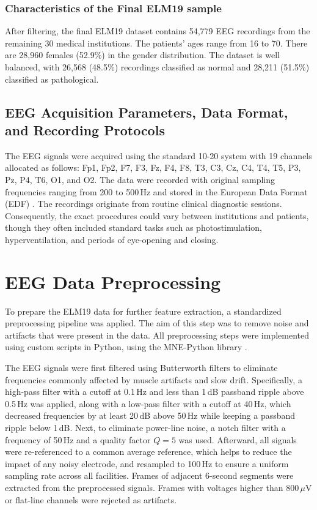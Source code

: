 \documentclass{bachelor2025eng}
\begin{document}
        \subsubsection{Characteristics of the Final ELM19 sample}
        After filtering, the final ELM19 dataset contains 54,779  EEG recordings from the remaining 30 medical institutions. The patients' ages range from 16 to 70. There are 28,960 females (52.9\%) in the gender distribution. The dataset is well balanced, with 26,568 (48.5\%) recordings classified as normal and 28,211 (51.5\%) classified as pathological.

        \subsection{EEG Acquisition Parameters, Data Format, and Recording Protocols}
        The EEG signals were acquired using the standard 10-20 system with 19 channels allocated as follows: Fp1, Fp2, F7, F3, Fz, F4, F8, T3, C3, Cz, C4, T4, T5, P3, Pz, P4, T6, O1, and O2. The data were recorded with original sampling frequencies ranging from 200 to 500\,Hz and stored in the European Data Format (EDF) \cite{Kemp1992}. The recordings originate from routine clinical diagnostic sessions. Consequently, the exact procedures could vary between institutions and patients, though they often included standard tasks such as photostimulation, hyperventilation, and periods of eye-opening and closing.          

    \section{EEG Data Preprocessing}
        To prepare the ELM19 data for further feature extraction, a standardized preprocessing pipeline was applied. The aim of this step was to remove noise and artifacts that were present in the data. All preprocessing steps were implemented using custom scripts in Python, using the MNE-Python library \cite{Gramfort2013}.

        The EEG signals were first filtered using Butterworth filters to eliminate frequencies commonly affected by muscle artifacts and slow drift. Specifically, a high-pass filter with a cutoff at 0.1\,Hz and less than 1\,dB passband ripple above 0.5\,Hz was applied, along with a low-pass filter with a cutoff at 40\,Hz,  which decreased frequencies by at least 20\,dB above 50\,Hz while keeping a passband ripple below 1\,dB. Next, to eliminate power-line noise, a notch filter with a frequency of 50\,Hz and a quality factor $Q = 5$ was used. Afterward, all signals were re-referenced to a common average reference, which helps to reduce the impact of any noisy electrode, and resampled to 100\,Hz to ensure a uniform sampling rate across all facilities. Frames of adjacent 6-second segments were extracted from the preprocessed signals. Frames with voltages higher than 800\,$\mu$V or flat-line channels were rejected as artifacts.
        
\end{document}
